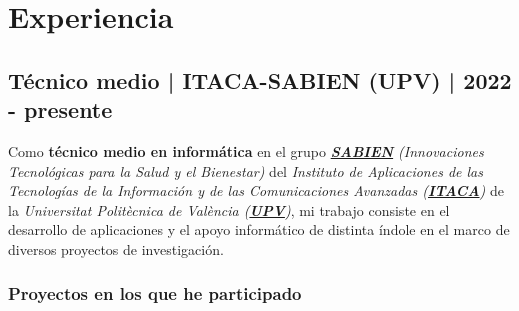 \documentclass[letterpaper, 12pt, dvipsnames]{article}
\newcommand{\uniFull}{Universitat Politècnica de València}
\newcommand{\uniUrl}{https://www.upv.es/es}
\newcommand{\sabienUrl}{http://www.sabien.upv.es/}
\begin{document}
\begin{adjustwidth}{-1.5cm}{}
\end{adjustwidth}

\pagebreak

\section{Experiencia}

\subsection{Técnico medio | ITACA-SABIEN (UPV) | 2022 - presente}

Como \textbf{técnico medio en informática} en el grupo \emph{\textbf{\href{\sabienUrl}{SABIEN}} (Innovaciones Tecnológicas para la Salud y el Bienestar)} del \emph{Instituto de Aplicaciones de las Tecnologías de la Información y de las Comunicaciones Avanzadas (\textbf{\href{http://www.itaca.upv.es/}{ITACA}})} de la \emph{{\uniFull} (\textbf{\href{\uniUrl}{UPV}})}, mi trabajo consiste en el desarrollo de aplicaciones y el apoyo informático de distinta índole en el marco de diversos proyectos de investigación.

\subsubsection{Proyectos en los que he participado}
\end{document}

